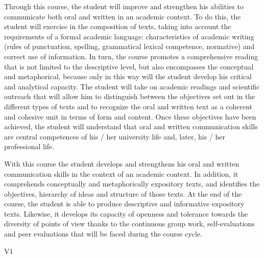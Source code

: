 \begin{syllabus}


\begin{justification}
Through this course, the student will improve and strengthen his abilities to communicate both oral and written in an academic context. To do this, the student will exercise in the composition of texts, taking into account the requirements of a formal academic language: characteristics of academic writing (rules of punctuation, spelling, grammatical lexical competence, normative) and correct use of information. In turn, the course promotes a comprehensive reading that is not limited to the descriptive level, but also encompasses the conceptual and metaphorical, because only in this way will the student develop his critical and analytical capacity. The student will take on academic readings and scientific outreach that will allow him to distinguish between the objectives set out in the different types of texts and to recognize the oral and written text as a coherent and cohesive unit in terms of form and content. Once these objectives have been achieved, the student will understand that oral and written 
communication skills are central competences of his / her university life and, later, his / her professional life. 
\end{justification}

\begin{goals}
\item With this course the student develops and strengthens his oral and written communication skills in the context of an academic context. In addition, it comprehends conceptually and metaphorically expository texts, and identifies the objectives, hierarchy of ideas and structure of those texts. At the end of the course, the student is able to produce descriptive and informative expository texts. Likewise, it develops its capacity of openness and tolerance towards the diversity of points of view thanks to the continuous group work, self-evaluations and peer evaluations that will be faced during the course cycle.
\end{goals}

\begin{outcomes}{V1}
    \item {}
    \item {}
    \item {}
    \item {}
\end{outcomes}


\end{syllabus}
